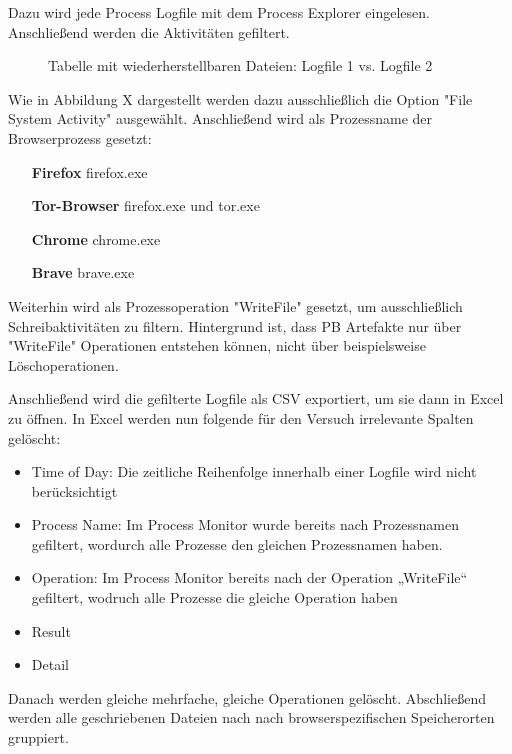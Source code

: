 Dazu wird jede Process Logfile mit dem Process Explorer eingelesen. Anschließend werden die Aktivitäten gefiltert.
\begin{figure}[h!]
	\caption{Tabelle mit wiederherstellbaren Dateien: Logfile 1 vs. Logfile 2}
\end{figure}
Wie in Abbildung X dargestellt werden dazu ausschließlich die Option "File System Activity" ausgewählt.
Anschließend wird als Prozessname der Browserprozess gesetzt:
\begin{itemize}
\item[\textbf{Firefox}] firefox.exe
\item[\textbf{Tor-Browser}] firefox.exe und tor.exe
\item[\textbf{Chrome}] chrome.exe
\item[\textbf{Brave}] brave.exe
\end{itemize}
Weiterhin wird als Prozessoperation "WriteFile" gesetzt, um ausschließlich Schreibaktivitäten zu filtern. Hintergrund ist, dass PB Artefakte nur über "WriteFile" Operationen entstehen können, nicht über beispielsweise Löschoperationen.

Anschließend wird die gefilterte Logfile als CSV exportiert, um sie dann in Excel zu öffnen.
In Excel werden nun folgende für den Versuch irrelevante Spalten gelöscht:
\begin{itemize}
\item Time of Day: Die zeitliche Reihenfolge innerhalb einer Logfile wird nicht berücksichtigt
\item Process Name: Im Process Monitor wurde bereits nach Prozessnamen gefiltert, wordurch alle Prozesse den gleichen Prozessnamen haben.
\item Operation: Im Process Monitor bereits nach der Operation „WriteFile“ gefiltert, wodruch alle Prozesse die gleiche Operation haben
\item Result
\item Detail
\end{itemize}
Danach werden gleiche mehrfache, gleiche Operationen gelöscht.
Abschließend werden alle geschriebenen Dateien nach nach browserspezifischen Speicherorten gruppiert.

